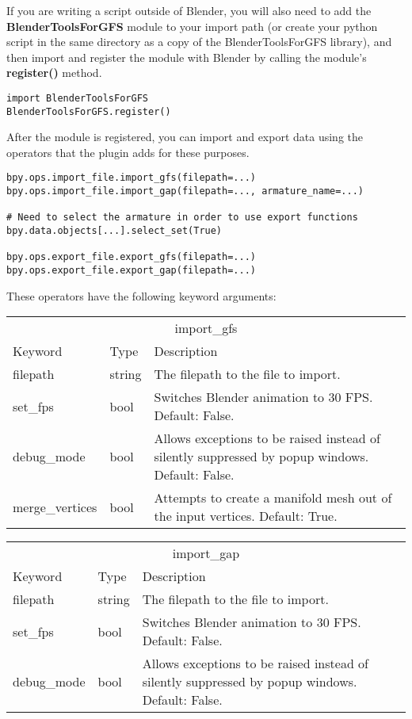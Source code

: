 \documentclass{article}
\begin{document}
If you are writing a script outside of Blender, you will also need to add the \textbf{BlenderToolsForGFS} module to your import path (or create your python script in the same directory as a copy of the BlenderToolsForGFS library), and then import and register the module with Blender by calling the module's \textbf{register()} method.
\begin{lstlisting}[style=pythonstyling]
import BlenderToolsForGFS
BlenderToolsForGFS.register()
\end{lstlisting}

After the module is registered, you can import and export data using the operators that the plugin adds for these purposes.
\begin{lstlisting}[style=pythonstyling]
bpy.ops.import_file.import_gfs(filepath=...)
bpy.ops.import_file.import_gap(filepath=..., armature_name=...)

# Need to select the armature in order to use export functions
bpy.data.objects[...].select_set(True)

bpy.ops.export_file.export_gfs(filepath=...)
bpy.ops.export_file.export_gap(filepath=...)
\end{lstlisting}

These operators have the following keyword arguments:
\begin{center}
\begin{tabular}{p{}p{}p{}}
\hline
\multicolumn{3}{c}{import\_gfs}\\
Keyword & Type & Description\\
\hline
filepath & string & The filepath to the file to import.\\
set\_fps & bool & Switches Blender animation to 30 FPS. Default: False.\\
debug\_mode & bool & Allows exceptions to be raised instead of silently suppressed by popup windows. Default: False.\\
merge\_vertices & bool & Attempts to create a manifold mesh out of the input vertices. Default: True.\\
\hline
\end{tabular}
\end{center}

\begin{center}
\begin{tabular}{p{}p{}p{}}
\hline
\multicolumn{3}{c}{import\_gap}\\
Keyword & Type & Description\\
\hline
filepath & string & The filepath to the file to import.\\
set\_fps & bool & Switches Blender animation to 30 FPS. Default: False.\\
debug\_mode & bool & Allows exceptions to be raised instead of silently suppressed by popup windows. Default: False.\\
\hline
\end{tabular}
\end{center}
\end{document}

